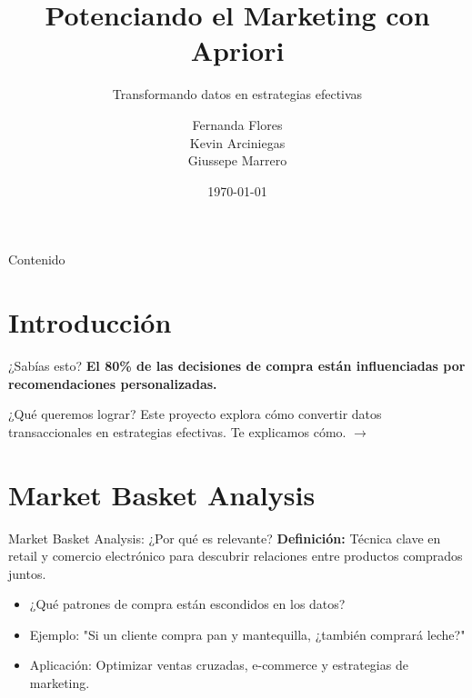\documentclass{beamer}
\title{Potenciando el Marketing con Apriori}
\subtitle{Transformando datos en estrategias efectivas}
\author{
    \begin{tabular}{c} 
    Fernanda Flores \\ 
    Kevin Arciniegas \\ 
    Giussepe Marrero
    \end{tabular}
}
\institute{4Geeks Academy}
\date{\today}
\begin{document}
\begin{frame}
    \titlepage
\end{frame}

\begin{frame}{Contenido}
    \tableofcontents
\end{frame}

\section{Introducción}
\begin{frame}{¿Sabías esto?}
    \centering
    \Large
    \textbf{El 80\% de las decisiones de compra están influenciadas por recomendaciones personalizadas.}
\end{frame}

\usepackage{fontspec}
\usepackage{emoji}

\begin{frame}{¿Qué queremos lograr?}
    \centering
    \Large
    Este proyecto explora cómo convertir datos transaccionales en estrategias efectivas.  
    \vspace{1em}
    Te explicamos cómo. $\rightarrow$
\end{frame}

\section{Market Basket Analysis}
\begin{frame}{Market Basket Analysis: ¿Por qué es relevante?}
    \textbf{Definición:}  
    Técnica clave en retail y comercio electrónico para descubrir relaciones entre productos comprados juntos.  
    \begin{itemize}
        \item ¿Qué patrones de compra están escondidos en los datos?
        \item Ejemplo: "Si un cliente compra pan y mantequilla, ¿también comprará leche?"
        \item Aplicación: Optimizar ventas cruzadas, e-commerce y estrategias de marketing.
    \end{itemize}
\end{frame}
\end{document}
